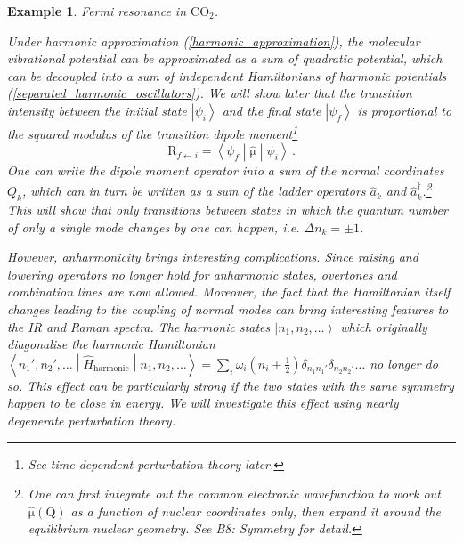 \documentclass{article}
\theoremstyle{plain}\theoremheaderfont{\normalfont\itshape}\theorembodyfont{\rmfamily}\theoremseparator{.}\newtheorem*{rem}{Remark}\newtheorem*{ex}{Example}\newtheorem*{proof}{Proof}\newtheorem*{altp}{Alternative proof}
\theoremstyle{plain}\theoremheaderfont{\normalfont\bfseries}\theorembodyfont{\rmfamily}\theoremseparator{.}\newtheorem{thm}{Theorem}[section]\newtheorem{lem}[thm]{Lemma}\newtheorem{prop}[thm]{Proposition}\newtheorem*{cor}{Corollary}\newtheorem{defn}[thm]{Definition}\newtheorem{clm}[thm]{Claim}\newtheorem{clminproof}{Claim}
\theoremstyle{break}\theoremheaderfont{\normalfont\itshape}\theorembodyfont{\rmfamily}\theoremseparator{.\medskip}\newtheorem*{proofskip}{Proof}\newtheorem*{exs}{Examples}\newtheorem*{rems}{Remarks}
\theoremstyle{break}\theoremheaderfont{\normalfont\bfseries}\theorembodyfont{\rmfamily}\theoremseparator{.\medskip}\newtheorem{lemskip}[thm]{Lemma}\newtheorem{defnskip}[thm]{Definition}\newtheorem{propskip}[thm]{Proposition}\newtheorem{thmskip}[thm]{Theorem}
\numberwithin{equation}{section}
\newcommand{\ket}[1]{\left| #1 \right\rangle}
\newcommand{\mel}[3]{\left\langle #1 \middle| #2 \middle| #3 \right\rangle}
\newcommand{\vb}[1]{\bm{\mathrm{#1}}}
\begin{document}
    \begin{ex}
        \textit{Fermi resonance in \(\mathrm{CO_2}\).}

        Under harmonic approximation (\ref{harmonic_approximation}), the molecular vibrational potential can be approximated as a sum of quadratic potential, which can be decoupled into a sum of independent Hamiltonians of harmonic potentials (\ref{separated_harmonic_oscillators}). We will show later that the transition intensity between the initial state \(\ket{\psi_i}\) and the final state \(\ket{\psi_f}\) is proportional to the squared modulus of the transition dipole moment\footnote{See time-dependent perturbation theory later.}
        \begin{equation}
            \vb{R}_{f\leftarrow i}=\mel{\psi_f}{\hat{\vb{\mu}}}{\psi_i}\,.
        \end{equation}
        One can write the dipole moment operator into a sum of the normal coordinates \(Q_k\), which can in turn be written as a sum of the ladder operators \(\hat{a}_k\) and \(\hat{a}_k^\dagger\).\footnote{One can first integrate out the common electronic wavefunction to work out \(\hat{\vb{\mu}}(\vb{Q})\) as a function of nuclear coordinates only, then expand it around the equilibrium nuclear geometry. See \textit{B8: Symmetry} for detail.} This will show that only transitions between states in which the quantum number of only a single mode changes by one can happen, i.e. \(\Delta n_k = \pm 1\).

        However, anharmonicity brings interesting complications. Since raising and lowering operators no longer hold for anharmonic states, overtones and combination lines are now allowed. Moreover, the fact that the Hamiltonian itself changes leading to the coupling of normal modes can bring interesting features to the IR and Raman spectra. The harmonic states \(\ket{n_1,n_2,\dots}\) which originally diagonalise the harmonic Hamiltonian \(\mel{n_1',n_2',\dots}{\hat{H}_{\text{harmonic}}}{n_1,n_2,\dots}=\sum_i\omega_i(n_i+\frac{1}{2})\delta_{n_1n_1'}\delta_{n_2n_2'}\dots\) no longer do so. This effect can be particularly strong if the two states with the same symmetry happen to be close in energy. We will investigate this effect using nearly degenerate perturbation theory.


\end{ex}
\end{document}
